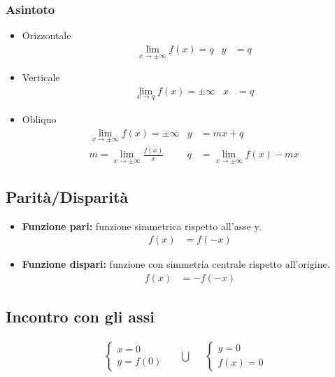 \documentclass[a4paper]{article}
\begin{document}
		\subsubsection{Asintoto}
		\begin{itemize}
			\item Orizzontale\\
			\begin{align*}
				&\lim\limits_{x \to \pm \infty}{f(x)} = q	&	y&=q
			\end{align*}
			
			\item Verticale\\
			\begin{align*}
				&\lim\limits_{x \to q}{f(x)} = \pm \infty	&	x&=q
			\end{align*}
			\item Obliquo\\
			\begin{align*}
			&\lim\limits_{x \to \pm \infty}{f(x)} = \pm \infty	&	y&=mx+q\\
			&m=\lim\limits_{x \to \pm \infty}{\frac{f(x)}{x}}   &	q&=\lim\limits_{x \to \pm \infty}{f(x)-mx}
			\end{align*}
						
		\end{itemize}
		
		\subsection{Parità/Disparità}
		\begin{itemize}
			\item \textbf{Funzione pari:} funzione simmetrica rispetto all'asse y.
			\begin{align*}
				f(x) &= f(-x)
			\end{align*}
			\item \textbf{Funzione dispari:} funzione con simmetria centrale rispetto all'origine.
			\begin{align*}
				f(x) &= -f(-x)
			\end{align*}
		\end{itemize}
		
		\subsection{Incontro con gli assi}
		\begin{align*}
			&\begin{cases}
			x = 0\\
			y = f(0)
			\end{cases}	&	&\bigcup &	&\begin{cases}
			y = 0\\
			f(x) = 0
			\end{cases}
		\end{align*}
		
\end{document}
